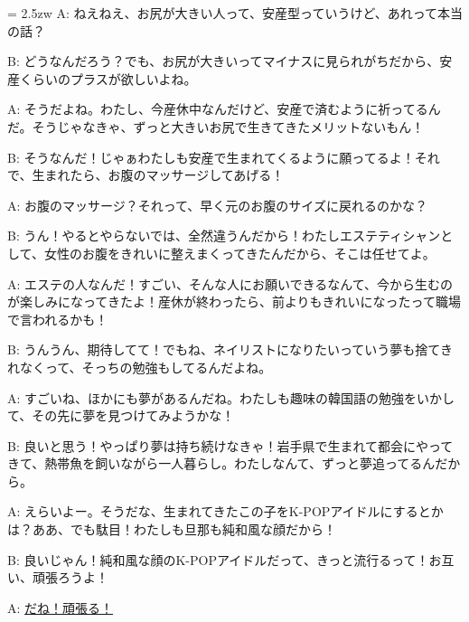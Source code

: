 \documentclass[11pt]{amsart}
\title{}
\author{}
\newenvironment{hangall}[1]{\hangindent = 2.5zw\everypar{\hangindent = 2.5zw}}{}
\begin{document}
\maketitle
\begin{hangall}{}%
A: ねえねえ、お尻が大きい人って、安産型っていうけど、あれって本当の話？

B: どうなんだろう？でも、お尻が大きいってマイナスに見られがちだから、安産くらいのプラスが欲しいよね。

A: そうだよね。わたし、今産休中なんだけど、安産で済むように祈ってるんだ。そうじゃなきゃ、ずっと大きいお尻で生きてきたメリットないもん！

B: そうなんだ！じゃぁわたしも安産で生まれてくるように願ってるよ！それで、生まれたら、お腹のマッサージしてあげる！

A: お腹のマッサージ？それって、早く元のお腹のサイズに戻れるのかな？

B: うん！やるとやらないでは、全然違うんだから！わたしエステティシャンとして、女性のお腹をきれいに整えまくってきたんだから、そこは任せてよ。

A: エステの人なんだ！すごい、そんな人にお願いできるなんて、今から生むのが楽しみになってきたよ！産休が終わったら、前よりもきれいになったって職場で言われるかも！

B: うんうん、期待してて！でもね、ネイリストになりたいっていう夢も捨てきれなくって、そっちの勉強もしてるんだよね。

A: すごいね、ほかにも夢があるんだね。わたしも趣味の韓国語の勉強をいかして、その先に夢を見つけてみようかな！

B: 良いと思う！やっぱり夢は持ち続けなきゃ！岩手県で生まれて都会にやってきて、熱帯魚を飼いながら一人暮らし。わたしなんて、ずっと夢追ってるんだから。

A: えらいよー。そうだな、生まれてきたこの子をK-POPアイドルにするとかは？ああ、でも駄目！わたしも旦那も純和風な顔だから！

B: 良いじゃん！純和風な顔のK-POPアイドルだって、きっと流行るって！お互い、頑張ろうよ！

A: \ul{だね！頑張る！}\end{hangall}
\end{document}
